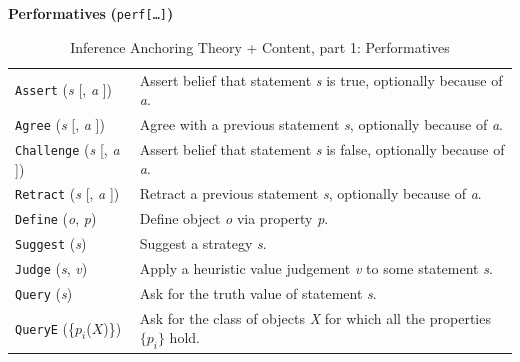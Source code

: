 \documentclass[smallextended,oneside]{svjour3}       %
\begin{document}
\begin{table}[ht]
\begin{mdframed}
{\centering
\textbf{Performatives} \textbf{(}\texttt{perf[\ldots]}\textbf{)}

\par}

\smallskip

\begin{tabular}{@{\hspace{-.25ex}}p{}p{}}
\texttt{Assert} (\emph{s} [, \emph{a} ]) & Assert belief that statement \emph{s} is true, optionally because of \emph{a}.\\
\texttt{Agree} (\emph{s} [, \emph{a} ]) & Agree with a previous statement \emph{s}, optionally because of \emph{a}.\\
\texttt{Challenge} (\emph{s} [, \emph{a} ]) & Assert belief that statement \emph{s} is false, optionally because of \emph{a}.\\
\texttt{Retract} (\emph{s} [, \emph{a} ]) & Retract a previous statement \emph{s}, optionally because of \emph{a}.\\
\texttt{Define} (\emph{o}, \emph{p}) & Define object \emph{o} via property \emph{p}.\\
\texttt{Suggest} (\emph{s}) & Suggest a strategy \emph{s}.\\
\texttt{Judge} (\emph{s}, \emph{v}) & Apply a heuristic value judgement \emph{v} to some statement \emph{s}.\\
\texttt{Query} (\emph{s}) & Ask for the truth value of statement \emph{s}.\\
\texttt{QueryE} (\{$p_i$($X$)\}) & Ask for the class of objects \emph{X} for which all the properties $\{p_i\}$ hold.
\end{tabular}

\end{mdframed}
\caption{Inference Anchoring Theory + Content, part 1: Performatives\label{iatc-table:1}}
\end{table}

\newpage 
\end{document}
